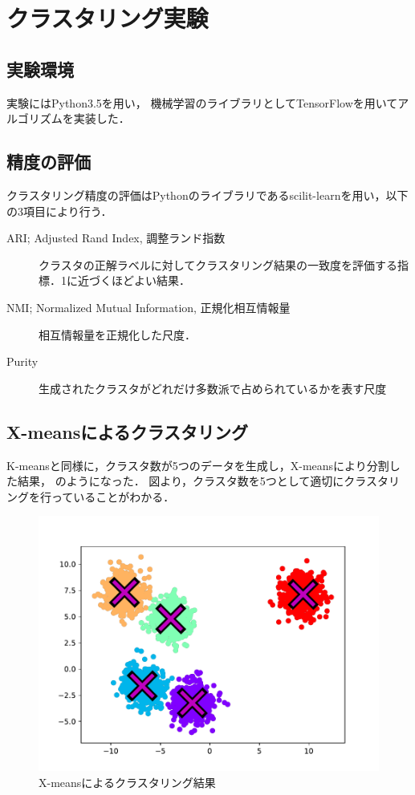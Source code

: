 \section{クラスタリング実験}

\subsection{実験環境}
実験にはPython3.5を用い，
機械学習のライブラリとしてTensorFlowを用いてアルゴリズムを実装した．

\subsection{精度の評価}
クラスタリング精度の評価はPythonのライブラリであるscilit-learnを用い，以下の3項目により行う．
\begin{description}
  \item[ARI; Adjusted Rand Index, 調整ランド指数]
    クラスタの正解ラベルに対してクラスタリング結果の一致度を評価する指標．1に近づくほどよい結果．
  \item[NMI; Normalized Mutual Information, 正規化相互情報量]
    相互情報量を正規化した尺度．
  \item[Purity]
    生成されたクラスタがどれだけ多数派で占められているかを表す尺度
\end{description}

\subsection{X-meansによるクラスタリング}
K-meansと同様に，クラスタ数が5つのデータを生成し，X-meansにより分割した結果，
のようになった．
図より，クラスタ数を5つとして適切にクラスタリングを行っていることがわかる．

\begin{figure}[htbp]
  \begin{center}
    \includegraphics[width=0.8\linewidth]{img/x-means/after.pdf}
    \caption{X-meansによるクラスタリング結果}
    \label{img:xmeans-after}
  \end{center}
\end{figure}
